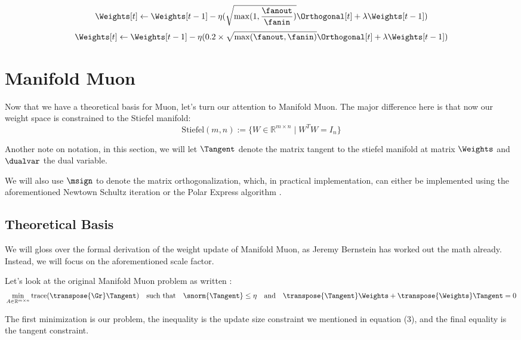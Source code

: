 \documentclass[12pt]{article}
\begin{document}
\begin{align}
    \Weights[t] \gets \Weights[t-1] - \eta(\sqrt{\max(1, \frac{\fanout}{\fanin})}\Orthogonal[t] + \lambda \Weights[t-1])
\end{align}
\begin{align}
    \Weights[t] \gets \Weights[t-1] - \eta(0.2 \times \sqrt{\max(\fanout, \fanin)}\Orthogonal[t] + \lambda \Weights[t-1])
\end{align}

\section{Manifold Muon}

Now that we have a theoretical basis for Muon, let's turn our attention to Manifold Muon. The major difference here is that now our weight space is constrained to the Stiefel manifold:
\[\text{Stiefel}(m,n) := \{W \in \mathbb{R}^{m \times n} \mid W^TW = I_n\}\]

Another note on notation, in this section, we will let $\Tangent$ denote the matrix tangent to the stiefel manifold at matrix $\Weights$ and $\dualvar$ the dual variable. 

We will also use $\msign$  to denote the matrix orthogonalization, which, in practical implementation, can either be implemented using the aforementioned Newtown Schultz iteration or the Polar Express algorithm \cite{amsel2025polarexpressoptimalmatrix}.

\subsection{Theoretical Basis}

We will gloss over the formal derivation of the weight update of Manifold Muon, as Jeremy Bernstein has worked out the math already. Instead, we will focus on the aforementioned scale factor. 

Let's look at the original Manifold Muon problem as written \cite{bernstein2025manifolds}:
\begin{align}
    \min_{A \in \mathbb{R}^{m \times n}} \text{trace}(\transpose{\Gr} \Tangent) \quad \text{such that} \quad \snorm{\Tangent} \le \eta  \quad \text{and} \quad \transpose{\Tangent}\Weights + \transpose{\Weights}\Tangent = 0
\end{align}

The first minimization is our problem, the inequality is the update size constraint we mentioned in equation (3), and the final equality is the tangent constraint. 
\end{document}
